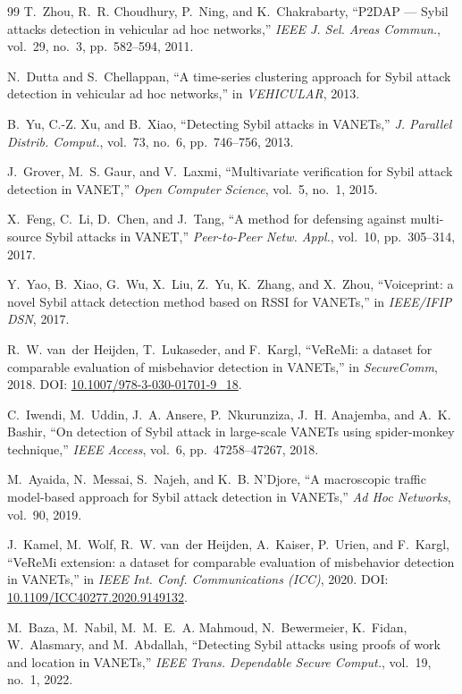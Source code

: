 \documentclass[journal,twoside]{IEEEtran}
\begin{document}
\begin{thebibliography}{99}
 T.~Zhou, R.~R. Choudhury, P.~Ning, and K.~Chakrabarty, ``P2DAP --- Sybil attacks detection in vehicular ad hoc networks,'' \emph{IEEE J. Sel. Areas Commun.}, vol.~29, no.~3, pp.~582--594, 2011.

 N.~Dutta and S.~Chellappan, ``A time-series clustering approach for Sybil attack detection in vehicular ad hoc networks,'' in \emph{VEHICULAR}, 2013.

 B.~Yu, C.-Z. Xu, and B.~Xiao, ``Detecting Sybil attacks in VANETs,'' \emph{J. Parallel Distrib. Comput.}, vol.~73, no.~6, pp.~746--756, 2013.

 J.~Grover, M.~S. Gaur, and V.~Laxmi, ``Multivariate verification for Sybil attack detection in VANET,'' \emph{Open Computer Science}, vol.~5, no.~1, 2015.

 X.~Feng, C.~Li, D.~Chen, and J.~Tang, ``A method for defensing against multi-source Sybil attacks in VANET,'' \emph{Peer-to-Peer Netw. Appl.}, vol.~10, pp.~305--314, 2017.

 Y.~Yao, B.~Xiao, G.~Wu, X.~Liu, Z.~Yu, K.~Zhang, and X.~Zhou, ``Voiceprint: a novel Sybil attack detection method based on RSSI for VANETs,'' in \emph{IEEE/IFIP DSN}, 2017.

 R.~W. van~der Heijden, T.~Lukaseder, and F.~Kargl, ``VeReMi: a dataset for comparable evaluation of misbehavior detection in VANETs,'' in \emph{SecureComm}, 2018. DOI: \url{10.1007/978-3-030-01701-9\_18}.

 C.~Iwendi, M.~Uddin, J.~A. Ansere, P.~Nkurunziza, J.~H. Anajemba, and A.~K. Bashir, ``On detection of Sybil attack in large-scale VANETs using spider-monkey technique,'' \emph{IEEE Access}, vol.~6, pp.~47258--47267, 2018.

 M.~Ayaida, N.~Messai, S.~Najeh, and K.~B. N'Djore, ``A macroscopic traffic model-based approach for Sybil attack detection in VANETs,'' \emph{Ad Hoc Networks}, vol.~90, 2019.

 J.~Kamel, M.~Wolf, R.~W. van~der Heijden, A.~Kaiser, P.~Urien, and F.~Kargl, ``VeReMi extension: a dataset for comparable evaluation of misbehavior detection in VANETs,'' in \emph{IEEE Int. Conf. Communications (ICC)}, 2020. DOI: \url{10.1109/ICC40277.2020.9149132}.

 M.~Baza, M.~Nabil, M.~M.~E.~A. Mahmoud, N.~Bewermeier, K.~Fidan, W.~Alasmary, and M.~Abdallah, ``Detecting Sybil attacks using proofs of work and location in VANETs,'' \emph{IEEE Trans. Dependable Secure Comput.}, vol.~19, no.~1, 2022.


\end{thebibliography}
\end{document}
